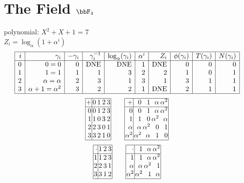 \section{The Field ${\bbF}_4$}
\label{app:F4}

polynomial: $X^{2} + X + 1$ = 7\\
$Z_i = \log_\alpha (1 + \alpha^i)$\\
$$\begin{array}{|*{10}{r|}}
\hline
i & \gamma_i & -\gamma_i& \gamma_i^{-1}& \log_\alpha(\gamma_i)& \alpha^i& Z_i& \phi(\gamma_i) & T(\gamma_i) & N(\gamma_i) \\
\hline
  0 & 0 = 0 &0 & \mbox{DNE} & \mbox{DNE} &1 & \mbox{DNE} &0 &0 &0\\
  1 &   1 = 1 &1 &1 &3 &2 &2 &1 &0 &1\\
  2 & \alpha = \alpha  &2 &3 &1 &3 &1 &3 &1 &1\\
  3 & \alpha +   1 = \alpha^{2} &3 &2 &2 &1 & \mbox{DNE} &2 &1 &1\\
\hline
\end{array}
$$
$$
\arraycolsep=1pt
\begin{array}{|r|*{4}{r}|}
\hline
+  &         0 &         1 &         2 &         3\\
\hline
         0&         0&         1&         2&         3\\
         1&         1&         0&         3&         2\\
         2&         2&         3&         0&         1\\
         3&         3&         2&         1&         0\\
\hline
\end{array}
\qquad
\arraycolsep=1pt
\begin{array}{|r|*{4}{r}|}
\hline
+  &0 &1 &\alpha  &\alpha^{2}\\
\hline
0&0&1&\alpha &\alpha^{2}\\
1&1&0&\alpha^{2}&\alpha \\
\alpha &\alpha &\alpha^{2}&0&1\\
\alpha^{2}&\alpha^{2}&\alpha &1&0\\
\hline
\end{array}
$$
$$
\arraycolsep=1pt
\begin{array}{|r|*{3}{r}|}
\hline
\cdot  &         1 &         2 &         3\\
\hline
         1&         1&         2&         3\\
         2&         2&         3&         1\\
         3&         3&         1&         2\\
\hline
\end{array}
\qquad
\arraycolsep=1pt
\begin{array}{|r|*{3}{r}|}
\hline
\cdot  &1 &\alpha  &\alpha^{2}\\
\hline
  1&  1&\alpha &\alpha^{2}\\
\alpha &\alpha &\alpha^{2}&  1\\
\alpha^{2}&\alpha^{2}&  1&\alpha \\
\hline
\end{array}
$$

